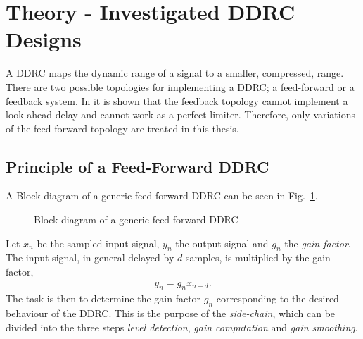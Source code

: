 \documentclass[../main2.tex]{subfiles}
\providecommand{\rootdir}{..}
\begin{document}
\FloatBarrier
\section{Theory - Investigated DDRC Designs} \label{theory_DDRC}
A DDRC maps the dynamic range of a signal to a smaller, compressed, range. There are two possible topologies for implementing a DDRC; a feed-forward or a feedback system. In \cite{reiss2012tutorial} it is shown that the feedback topology cannot implement a look-ahead delay and cannot work as a perfect limiter. Therefore, only variations of the feed-forward topology are treated in this thesis. 

\subsection{Principle of a Feed-Forward DDRC}
A Block diagram of a generic feed-forward DDRC can be seen in Fig.~\ref{fig:block_genericDDRC}.
\begin{figure}[h]
\centerline{}
\caption{Block diagram of a generic feed-forward DDRC}
\label{fig:block_genericDDRC}
\end{figure}

Let $x_n$ be the sampled input signal, $y_n$ the output signal and $g_n$ the \emph{gain factor}. The input signal, in general delayed by $d$ samples, is multiplied by the gain factor,
\begin{align}
y_n = g_nx_{n-d}.
\label{eq:gainfactor}
\end{align}
The task is then to determine the gain factor $g_n$ corresponding to the desired behaviour of the DDRC. This is the purpose of the \emph{side-chain}, which can be divided into the three steps \emph{level detection}, \emph{gain computation} and \emph{gain smoothing}.






\end{document}
